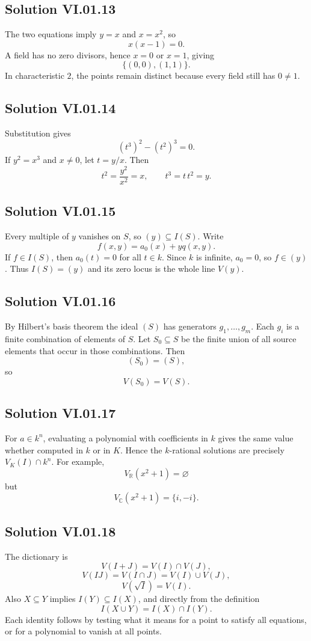 \subsection*{Solution VI.01.13}
The two equations imply \(y=x\) and \(x=x^2\), so
\[
x(x-1)=0.
\]
A field has no zero divisors, hence \(x=0\) or \(x=1\), giving
\[
\{(0,0),(1,1)\}.
\]
In characteristic \(2\), the points remain distinct because every field still has
\(0\neq1\).

\subsection*{Solution VI.01.14}
Substitution gives
\[
(t^3)^2-(t^2)^3=0.
\]
If \(y^2=x^3\) and \(x\neq0\), let \(t=y/x\).  Then
\[
t^2=\frac{y^2}{x^2}=x,
\qquad
t^3=t\,t^2=y.
\]

\subsection*{Solution VI.01.15}
Every multiple of \(y\) vanishes on \(S\), so \((y)\subseteq I(S)\).  Write
\[
f(x,y)=a_0(x)+yq(x,y).
\]
If \(f\in I(S)\), then \(a_0(t)=0\) for all \(t\in k\).  Since \(k\) is infinite,
\(a_0=0\), so \(f\in(y)\).  Thus \(I(S)=(y)\) and its zero locus is the whole line
\(V(y)\).

\subsection*{Solution VI.01.16}
By Hilbert's basis theorem the ideal \((S)\) has generators \(g_1,\dots,g_m\).  Each
\(g_i\) is a finite combination of elements of \(S\).  Let \(S_0\subseteq S\) be the
finite union of all source elements that occur in those combinations.  Then
\[
(S_0)=(S),
\]
so
\[
V(S_0)=V(S).
\]

\subsection*{Solution VI.01.17}
For \(a\in k^n\), evaluating a polynomial with coefficients in \(k\) gives the same value
whether computed in \(k\) or in \(K\).  Hence the \(k\)-rational solutions are precisely
\(V_K(I)\cap k^n\).  For example,
\[
V_{\mathbb R}(x^2+1)=\varnothing
\]
but
\[
V_{\mathbb C}(x^2+1)=\{i,-i\}.
\]

\subsection*{Solution VI.01.18}
The dictionary is
\[
V(I+J)=V(I)\cap V(J),
\]
\[
V(IJ)=V(I\cap J)=V(I)\cup V(J),
\]
\[
V(\sqrt I)=V(I).
\]
Also \(X\subseteq Y\) implies \(I(Y)\subseteq I(X)\), and directly from the definition
\[
I(X\cup Y)=I(X)\cap I(Y).
\]
Each identity follows by testing what it means for a point to satisfy all equations, or for
a polynomial to vanish at all points.
